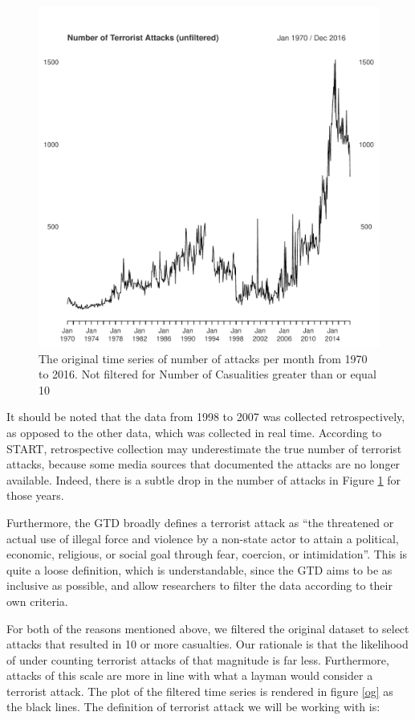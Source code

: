 \documentclass[11pt]{paper}
\begin{document}
\begin{figure}
\centering
\includegraphics[width=0.75\linewidth]{../image/og_og_og.pdf}
\caption{The original time series of number of attacks per month from 1970 to 2016. Not filtered for Number of Casualities greater than or equal 10}
\label{ogogog}
\end{figure}

It should be noted that the data from 1998 to 2007 was collected retrospectively, as opposed to the other data, which was collected in real time. According to START, retrospective collection may underestimate the true number of terrorist attacks, because some media sources that documented the attacks are no longer available. Indeed, there is a subtle drop in the number of attacks in Figure \ref{ogogog} for those years.

Furthermore, the GTD broadly defines a terrorist attack as ``the threatened or actual use of illegal force and violence by a non-state actor to attain a political, economic, religious, or social goal through fear, coercion, or intimidation''. This is quite a loose definition, which is understandable, since the GTD aims to be as inclusive as possible, and allow researchers to filter the data according to their own criteria.

For both of the reasons mentioned above, we filtered the original dataset to select attacks that resulted in 10 or more casualties. Our rationale is that the likelihood of under counting terrorist attacks of that magnitude is far less. Furthermore, attacks of this scale are more in line with what a layman would consider a terrorist attack. The plot of the filtered time series is rendered in figure \ref{og} as the black lines. The definition of terrorist attack we will be working with is:
\end{document}
